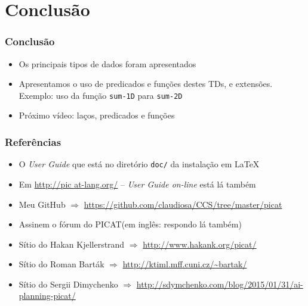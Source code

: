 \documentclass[10pt]{beamer}
\begin{document}
\section{Conclusão}
\begin{frame}
    \frametitle{Conclusão}
    \begin{itemize}
    \item Os principais tipos de dados foram apresentados
    
    \item Apresentamos o uso de predicados e funções destes TDs, 
    e extensões. Exemplo: uso da função \texttt{sum-1D} para \texttt{sum-2D}
    
    \item Próximo vídeo: laços, predicados e funções

    
    \end{itemize}
\end{frame}


\begin{frame}
    \frametitle{Referências}
    \begin{itemize}
    \item O \textit{User Guide} que está no diretório  \texttt{doc/} da instalação em \LaTeX 
    \item Em \url{http://pic at-lang.org/} -- \textit{User Guide on-line} está lá também
    
     \item Meu GitHub $\Rightarrow $ \url{https://github.com/claudiosa/CCS/tree/master/picat}
    
    \item Assinem o fórum do PICAT(em inglês: respondo lá também)

    \item Sítio do Hakan  Kjellerstrand  $\Rightarrow $ \url{http://www.hakank.org/picat/}
    \item Sítio do Roman Barták  $\Rightarrow $ \url{http://ktiml.mff.cuni.cz/~bartak/}
    \item Sítio do Sergii Dimychenko  $\Rightarrow $ \url{http://sdymchenko.com/blog/2015/01/31/ai-planning-picat/}
    
    \end{itemize}
\end{frame}
\end{document}
